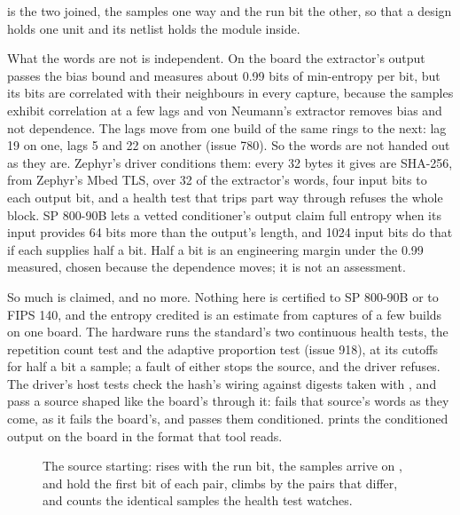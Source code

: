  is the two joined, the samples one way and the run bit
the other, so that a design holds one unit and its netlist holds the
module inside.

What the words are not is independent. On the board the extractor's
output passes the bias bound and measures about 0.99 bits of
min-entropy per bit, but its bits are correlated with their neighbours
in every capture, because the samples exhibit correlation at a few lags
and von Neumann's extractor removes bias and not dependence. The lags
move from one build of the same rings to the next: lag 19 on one,
lags 5 and 22 on another (issue 780). So the words are not handed out
as they are. Zephyr's driver conditions them: every 32 bytes it gives
are SHA-256, from Zephyr's Mbed TLS, over 32 of the extractor's words,
four input bits to each output bit, and a health test that trips part
way through refuses the whole block. SP 800-90B lets a vetted
conditioner's output claim full entropy when its input provides 64 bits
more than the output's length, and 1024 input bits do that if each
supplies half a bit. Half a bit is an engineering margin under the 0.99
measured, chosen because the dependence moves; it is not an
assessment.

So much is claimed, and no more. Nothing here is certified to SP
800-90B or to FIPS 140, and the entropy credited is an estimate from
captures of a few builds on one board. The hardware runs the standard's
two continuous health tests, the repetition count test and the
adaptive proportion test (issue 918), at its cutoffs for half a bit a
sample; a fault of either stops the source, and the driver refuses. The driver's host
tests check the hash's wiring against digests taken with
, and pass a source shaped like the board's through
it:  fails that source's words as they come, as
it fails the board's, and passes them conditioned.
 prints the conditioned output on the board in
the format that tool reads.

\begin{figure}[htbp]
\centering

\caption{The source starting:  rises with the run bit, the
samples arrive on ,  and  hold the
first bit of each pair,  climbs by the pairs that
differ, and  counts the identical samples the health
test watches.}
\label{fig:x-trng}
\end{figure}




